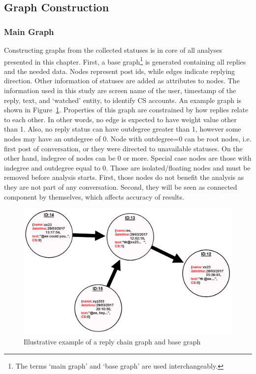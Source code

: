\documentclass[sigconf]{acmart}
\begin{document}
\subsection{Graph Construction}

\subsubsection{Main Graph}

Constructing graphs from the collected statuses is in core of all
analyses presented in this chapter. First, a base graph\footnote{The
terms `main graph' and `base graph' are used interchangeably.} is
generated containing all replies and the needed data. Nodes represent
post ids, while edges indicate replying direction. Other information
of statuses are added as attributes to nodes. The information used in
this study are screen name of the user, timestamp of the reply, text,
and `watched' entity, to identify CS accounts. An example graph is
shown in Figure~\ref{fig:replychaingraph}. Properties of this graph
are constrained by how replies relate to each other. In other words,
no edge is expected to have weight value other than 1. Also, no reply
status can have outdegree greater than 1, however some nodes may have
an outdegree of 0. Node with outdegree=0 can be root nodes, i.e. first
post of conversation, or they were directed to unavailable
statuses. On the other hand, indegree of nodes can be 0 or
more. Special case nodes are those with indegree and outdegree equal
to 0. Those are isolated/floating nodes and must be removed before
analysis starts. First, those nodes do not benefit the analysis as
they are not part of any conversation. Second, they will be seen as
connected component by themselves, which affects accuracy of results.

\begin{figure}[htb]
\centering
\includegraphics[width=\columnwidth]{images/replychaingraph.png}
\caption{Illustrative example of a reply chain graph and base graph}
\label{fig:replychaingraph}
\end{figure}
\end{document}
